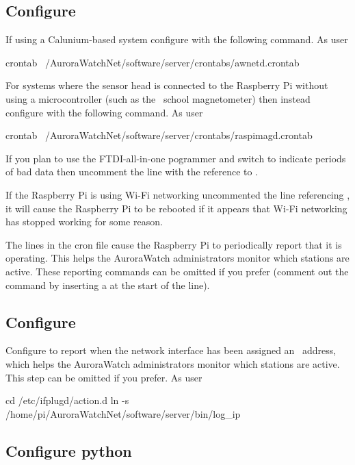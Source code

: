 \subsection{Configure \protect{}}
\label{sec:cron-configuration}

If using a Calunium-based system configure  with the
following command. As user \piUser
\begin{Cmd}
crontab ~/AuroraWatchNet/software/server/crontabs/awnetd.crontab
\end{Cmd}

For systems where the sensor head is connected to the Raspberry Pi
without using a microcontroller (such as the \bgs\ school
magnetometer) then instead configure  with the
following command. As user \piUser
\begin{Cmd}
crontab ~/AuroraWatchNet/software/server/crontabs/raspimagd.crontab
\end{Cmd}

If you plan to use the FTDI-all-in-one pogrammer and switch to
indicate periods of bad data then uncomment the line with the
reference to .

If the Raspberry Pi is using Wi-Fi networking uncommented the line
referencing , it will cause the Raspberry
Pi to be rebooted if it appears that Wi-Fi networking has stopped
working for some reason.

The  lines in the cron file cause the Raspberry Pi to
periodically report that it is operating. This helps the AuroraWatch
administrators monitor which stations are active. These reporting
commands can be omitted if you prefer (comment out the command by
inserting a \code{\#} at the start of the line).


\subsection{Configure \protect{}}

Configure  to report when the network interface has
been assigned an \ip\ address, which helps the AuroraWatch
administrators monitor which stations are active. This step can be
omitted if you prefer. As user \rootUser
\begin{Cmd}
cd /etc/ifplugd/action.d
ln -s /home/pi/AuroraWatchNet/software/server/bin/log_ip
\end{Cmd}

\subsection{Configure python}

